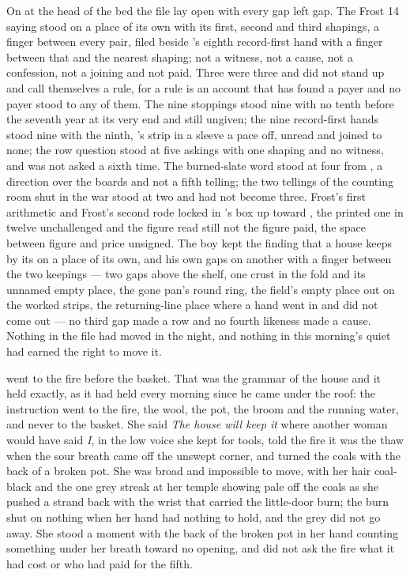 On  at the head of the bed the file lay open with every gap left gap. The Frost 14 saying stood on a place of its own with its first, second and third shapings, a finger between every pair, filed beside 's eighth record-first hand with a finger between that and the nearest shaping; not a witness, not a cause, not a confession, not a joining and not paid. Three were three and did not stand up and call themselves a rule, for a rule is an account that has found a payer and no payer stood to any of them. The nine stoppings stood nine with no tenth before the seventh year at its very end and still ungiven; the nine record-first hands stood nine with the ninth, 's strip in a sleeve a pace off, unread and joined to none; the row question stood at five askings with one shaping and no witness, and was not asked a sixth time. The burned-slate word stood at four from , a direction over the boards and not a fifth telling; the two tellings of the counting room shut in the war stood at two and had not become three. Frost's first arithmetic and Frost's second rode locked in 's box up  toward , the printed one in twelve unchallenged and the figure read still not the figure paid, the space between figure and price unsigned. The boy kept the finding that a house keeps by its  on a place of its own, and his own gaps on another with a finger between the two keepings --- two gaps above the shelf, one crust in the fold and its unnamed empty place, the gone pan's round ring, the field's empty place out on the worked strips, the returning-line place where a hand went in and did not come out --- no third gap made a row and no fourth likeness made a cause. Nothing in the file had moved in the night, and nothing in this morning's quiet had earned the right to move it.

\scenebreak

 went to the fire before the basket. That was the grammar of the house and it held exactly, as it had held every morning since he came under the roof: the instruction went to the fire, the wool, the pot, the broom and the running water, and never to the basket. She said \emph{The house will keep it} where another woman would have said \emph{I}, in the low voice she kept for tools, told the fire it was the thaw when the sour breath came off the unswept corner, and turned the coals with the back of a broken pot. She was broad and impossible to move, with her hair coal-black and the one grey streak at her temple showing pale off the coals as she pushed a strand back with the wrist that carried the little-door burn; the burn shut on nothing when her hand had nothing to hold, and the grey did not go away. She stood a moment with the back of the broken pot in her hand counting something under her breath toward no opening, and did not ask the fire what it had cost or who had paid for the fifth.

